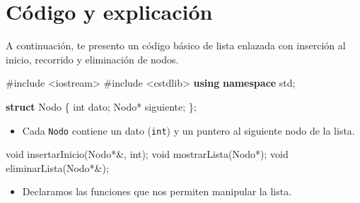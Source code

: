 \documentclass[
  11pt,
  a4paper,
  DIV=11,
  numbers=noendperiod]{scrreprt}
\newenvironment{Shaded}{\begin{snugshade}}{\end{snugshade}}
\newcommand{\DataTypeTok}[1]{\textcolor[rgb]{0.68,0.00,0.00}{#1}}
\newcommand{\ImportTok}[1]{\textcolor[rgb]{0.00,0.46,0.62}{#1}}
\newcommand{\KeywordTok}[1]{\textcolor[rgb]{0.00,0.23,0.31}{\textbf{#1}}}
\newcommand{\NormalTok}[1]{\textcolor[rgb]{0.00,0.23,0.31}{#1}}
\newcommand{\OperatorTok}[1]{\textcolor[rgb]{0.37,0.37,0.37}{#1}}
\newcommand{\PreprocessorTok}[1]{\textcolor[rgb]{0.68,0.00,0.00}{#1}}
\providecommand{\tightlist}{%
  \setlength{\itemsep}{0pt}\setlength{\parskip}{0pt}}
\begin{document}
\section{Código y explicación}\label{cuxf3digo-y-explicaciuxf3n-2}

A continuación, te presento un código básico de lista enlazada con
inserción al inicio, recorrido y eliminación de nodos.

\begin{Shaded}
\begin{Highlighting}[]
\PreprocessorTok{\#include }\ImportTok{\textless{}iostream\textgreater{}}
\PreprocessorTok{\#include }\ImportTok{\textless{}cstdlib\textgreater{}}
\KeywordTok{using} \KeywordTok{namespace}\NormalTok{ std}\OperatorTok{;}

\KeywordTok{struct}\NormalTok{ Nodo }\OperatorTok{\{}
    \DataTypeTok{int}\NormalTok{ dato}\OperatorTok{;}
\NormalTok{    Nodo}\OperatorTok{*}\NormalTok{ siguiente}\OperatorTok{;}
\OperatorTok{\};}
\end{Highlighting}
\end{Shaded}

\begin{itemize}
\tightlist
\item
  Cada \texttt{Nodo} contiene un dato (\texttt{int}) y un puntero al
  siguiente nodo de la lista.
\end{itemize}

\begin{Shaded}
\begin{Highlighting}[]
\DataTypeTok{void}\NormalTok{ insertarInicio}\OperatorTok{(}\NormalTok{Nodo}\OperatorTok{*\&,} \DataTypeTok{int}\OperatorTok{);}
\DataTypeTok{void}\NormalTok{ mostrarLista}\OperatorTok{(}\NormalTok{Nodo}\OperatorTok{*);}
\DataTypeTok{void}\NormalTok{ eliminarLista}\OperatorTok{(}\NormalTok{Nodo}\OperatorTok{*\&);}
\end{Highlighting}
\end{Shaded}

\begin{itemize}
\tightlist
\item
  Declaramos las funciones que nos permiten manipular la lista.
\end{itemize}
\end{document}
